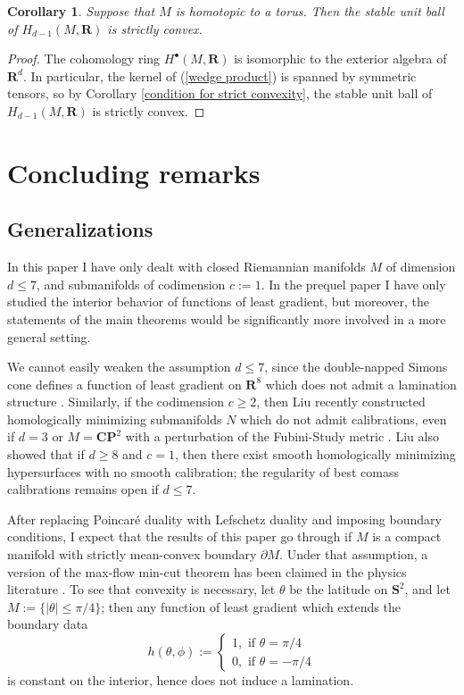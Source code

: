 \documentclass[reqno,11pt]{amsart}
\newcommand{\RR}{\mathbf{R}}
\newcommand{\CC}{\mathbf{C}}
\newcommand{\PP}{\mathbf P}
\newcommand{\Sph}{\mathbf S}
\newtheorem{corollary}[theorem]{Corollary}
\theoremstyle{definition}
\numberwithin{equation}{section}
\begin{document}
\begin{corollary}\label{torus convex}
Suppose that $M$ is homotopic to a torus.
Then the stable unit ball of $H_{d - 1}(M, \RR)$ is strictly convex.
\end{corollary}
\begin{proof}
The cohomology ring $H^\bullet(M, \RR)$ is isomorphic to the exterior algebra of $\RR^d$.
In particular, the kernel of (\ref{wedge product}) is spanned by symmetric tensors, so by Corollary \ref{condition for strict convexity}, the stable unit ball of $H_{d - 1}(M, \RR)$ is strictly convex.
\end{proof}


\section{Concluding remarks}\label{open problems}
\subsection{Generalizations}
In this paper I have only dealt with closed Riemannian manifolds $M$ of dimension $d \leq 7$, and submanifolds of codimension $c := 1$.
In the prequel paper \cite{BackusCML} I have only studied the interior behavior of functions of least gradient, but moreover, the statements of the main theorems would be significantly more involved in a more general setting.

We cannot easily weaken the assumption $d \leq 7$, since the double-napped Simons cone defines a function of least gradient on $\RR^8$ which does not admit a lamination structure \cite{BackusCML}.
Similarly, if the codimension $c \geq 2$, then Liu recently constructed homologically minimizing submanifolds $N$ which do not admit calibrations, even if $d = 3$ or $M = \CC \PP^2$ with a perturbation of the Fubini-Study metric \cite{liu2023homologically}.
Liu also showed that if $d \geq 8$ and $c = 1$, then there exist smooth homologically minimizing hypersurfaces with no smooth calibration; the regularity of best comass calibrations remains open if $d \leq 7$.

After replacing Poincar\'e duality with Lefschetz duality and imposing boundary conditions, I expect that the results of this paper go through if $M$ is a compact manifold with strictly mean-convex boundary $\partial M$.
Under that assumption, a version of the max-flow min-cut theorem has been claimed in the physics literature \cite[Appendix A]{Freedman_2016}.
To see that convexity is necessary, let $\theta$ be the latitude on $\Sph^2$, and let $M := \{|\theta| \leq \pi/4\}$; then any function of least gradient which extends the boundary data 
$$h(\theta, \phi) := \begin{cases} 1, \text{ if } \theta = \pi/4 \\ 0, \text{ if } \theta = -\pi/4\end{cases}$$
is constant on the interior, hence does not induce a lamination.
\end{document}
